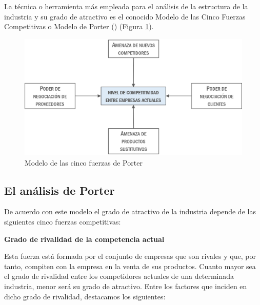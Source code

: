 \documentclass[
]{krantz}
\begin{document}
La técnica o herramienta más empleada para el análisis de la estructura de la industria y su grado de atractivo es el conocido Modelo de las Cinco Fuerzas Competitivas o Modelo de Porter (\citet{porter1982}) (Figura \ref{fig:18a-02}).

\begin{figure}
\centering
\includegraphics{images/18a-02.png}
\caption{\label{fig:18a-02}Modelo de las cinco fuerzas de Porter}
\end{figure}

\hypertarget{el-anuxe1lisis-de-porter}{%
\subsection{El análisis de Porter}\label{el-anuxe1lisis-de-porter}}

De acuerdo con este modelo el grado de atractivo de la industria depende de las siguientes cinco fuerzas competitivas:

\textbf{Grado de rivalidad de la competencia actual}

Esta fuerza está formada por el conjunto de empresas que son rivales y que, por tanto, compiten con la empresa en la venta de sus productos. Cuanto mayor sea el grado de rivalidad entre los competidores actuales de una determinada industria, menor será su grado de atractivo. Entre los factores que inciden en dicho grado de rivalidad, destacamos los siguientes:
\end{document}
